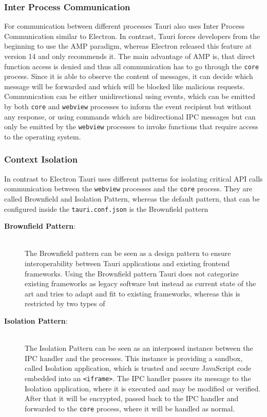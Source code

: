 \subsubsection{Inter Process Communication}
For communication between different processes Tauri also uses Inter Process Communication similar to Electron.
In contrast, Tauri forces developers from the beginning to use the \ac{AMP} paradigm, whereas Electron released this feature at version 14 and only recommends it.
The main advantage of \ac{AMP} is, that direct function access is denied and thus all communication has to go through the \texttt{core} process.
Since it is able to observe the content of messages, it can decide which message will be forwarded and which will be blocked like malicious requests.
Communication can be either unidirectional using events, which can be emitted by both \texttt{core} and \texttt{webview} processes to inform the event recipient but without any response,
or using commands which are bidirectional \ac{IPC} messages but can only be emitted by the \texttt{webview} processes to invoke functions that require access to the operating system.

\subsubsection{Context Isolation}
In contrast to Electron Tauri uses different patterns for isolating critical \ac{API} calls communication between the \texttt{webview} processes and the \texttt{core} process.
They are called Brownfield and Isolation Pattern, whereas the default pattern, that can be configured inside the \texttt{tauri.conf.json} is the Brownfield pattern
\begin{description}
    \item[\textbf{Brownfield Pattern}:] \hfill \\
    The Brownfield pattern can be seen as a design pattern to ensure interoperability between Tauri applications and existing frontend frameworks.
    Using the Brownfield pattern Tauri does not categorize existing frameworks as legacy software but instead as current state of the art and tries to adapt and fit to existing frameworks, whereas this is
    restricted by two types of
    \item[\textbf{Isolation Pattern}:] \hfill \\
    The Isolation Pattern can be seen as an interposed instance between the \ac{IPC} handler and the processes.
    This instance is providing a sandbox, called Isolation application, which is trusted and secure JavaScript code embedded into an \texttt{<iframe>}.
    The \ac{IPC} handler passes its message to the Isolation application, where it is executed and may be modified or verified.
    After that it will be encrypted, passed back to the \ac{IPC} handler and forwarded to the \texttt{core} process, where it will be handled as normal.


\end{description}


